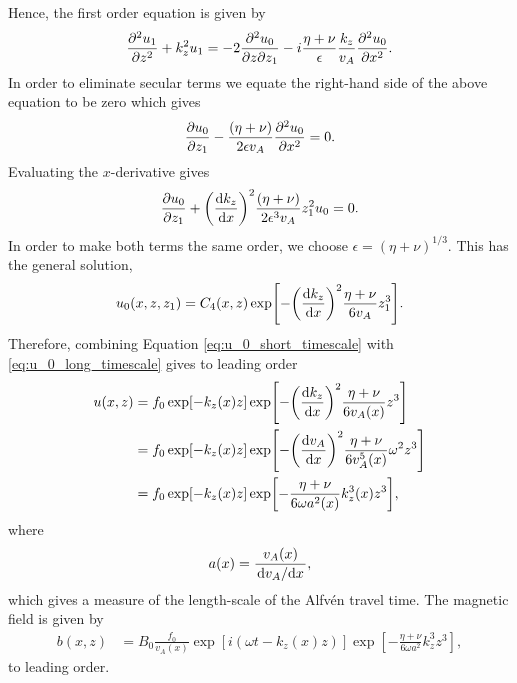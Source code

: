 Hence, the first order equation is given by
\begin{equation}
    \pdv[2]{u_1}{z}+k_z^2u_1 = -2\pdv{u_0}{z}{z_1}-i\frac{\eta+\nu}{\epsilon}\frac{k_z}{v_A}\pdv[2]{u_0}{x}.
\end{equation}
In order to eliminate secular terms we equate the right-hand side of the above equation to be zero which gives
\begin{equation}
    \pdv{u_0}{z_1}-\frac{(\eta+\nu)}{2\epsilon v_A}\pdv[2]{u_0}{x}=0.
\end{equation}
Evaluating the $x$-derivative gives
\begin{equation}
    \pdv{u_0}{z_1}+\qty(\dv{k_z}{x})^2\frac{(\eta+\nu)}{2\epsilon^3 v_A}z_1^2u_0=0.
\end{equation}
In order to make both terms the same order, we choose $\epsilon = (\eta+\nu)^{1/3}$. This has the general solution,
\begin{equation}
    \label{eq:u_0_long_timescale}
    u_0(x,z,z_1) = C_4(x,z)\exp[-\qty(\dv{k_z}{x})^2\frac{\eta+\nu}{6v_A}z_1^3].
\end{equation}
Therefore, combining Equation \eqref{eq:u_0_short_timescale} with \eqref{eq:u_0_long_timescale} gives to leading order
\begin{equation}
    \label{eq:leading_order_phase_mixed_soln}
    \begin{aligned}
    u(x,z) &= f_0\exp[-k_z(x)z]\exp[-\qty(\dv{k_z}{x})^2\frac{\eta+\nu}{6v_A(x)}z^3] \\
    &= f_0\exp[-k_z(x)z]\exp[-\qty(\dv{v_A}{x})^2\frac{\eta+\nu}{6v_A^5(x)}\omega^2 z^3] \\
    &= f_0\exp[-k_z(x)z]\exp[-\frac{\eta+\nu}{6\omega a^2(x)}k_z^3(x) z^3], \\
    \end{aligned}
\end{equation}
where 
\begin{equation}
    \label{eq:length_scale_alfven_travel_time}
    a(x) = \frac{v_A(x)}{\dv*{v_A}{x}},
\end{equation}
which gives a measure of the length-scale of the Alfv\'en travel time.
The magnetic field is given by
\begin{equation}
    \label{eq:leading_order_phase_mixed_soln_b}
    \begin{aligned}
    b(x,z) &= B_0\frac{f_0}{v_A(x)}\exp[i(\omega t-k_z(x)z)]\exp[-\frac{\eta+\nu}{6\omega a^2}k_z^3 z^3],
    \end{aligned}
\end{equation}
to leading order.
